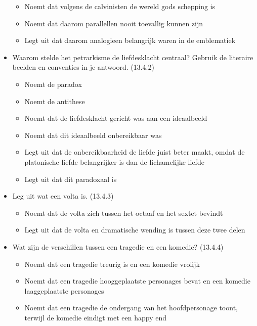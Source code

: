 \begin{itemize}
  \begin{itemize}
  \itemsep1pt\parskip0pt
  \item
    Noemt dat volgens de calvinisten de wereld gods schepping is
  \item
    Noemt dat daarom parallellen nooit toevallig kunnen zijn
  \item
    Legt uit dat daarom analogieen belangrijk waren in de emblematiek
  \end{itemize}
\item
  Waarom stelde het petrarkisme de liefdesklacht centraal? Gebruik de
  literaire beelden en conventies in je antwoord. (13.4.2)

  \begin{itemize}
  \itemsep1pt\parskip0pt
  \item
    Noemt de paradox
  \item
    Noemt de antithese
  \item
    Noemt dat de liefdesklacht gericht was aan een ideaalbeeld
  \item
    Noemt dat dit ideaalbeeld onbereikbaar was
  \item
    Legt uit dat de onbereikbaarheid de liefde juist beter maakt, omdat
    de platonische liefde belangrijker is dan de lichamelijke liefde
  \item
    Legt uit dat dit paradoxaal is
  \end{itemize}
\item
  Leg uit wat een volta is. (13.4.3)

  \begin{itemize}
  \itemsep1pt\parskip0pt
  \item
    Noemt dat de volta zich tussen het octaaf en het sextet bevindt
  \item
    Legt uit dat de volta en dramatische wending is tussen deze twee
    delen
  \end{itemize}
\item
  Wat zijn de verschillen tussen een tragedie en een komedie? (13.4.4)

  \begin{itemize}
  \itemsep1pt\parskip0pt
  \item
    Noemt dat een tragedie treurig is en een komedie vrolijk
  \item
    Noemt dat een tragedie hooggeplaatste personages bevat en een
    komedie laaggeplaatste personages
  \item
    Noemt dat een tragedie de ondergang van het hoofdpersonage toont,
    terwijl de komedie eindigt met een happy end
  \end{itemize}
\end{itemize}

